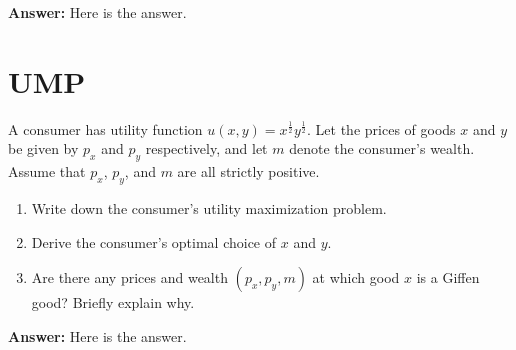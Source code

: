 \documentclass[12pt,a4paper]{article}
\begin{document}
\vspace{0.5cm}

\noindent\textbf{Answer:} Here is the answer.

\section{UMP}
A consumer has utility function $u(x,y)=x^{\frac{1}{2}}y^{\frac{1}{2}}$. Let the prices of goods $x$ and $y$ be given by $p_x$ and $p_y$ respectively, and let $m$ denote the consumer's wealth. Assume that $p_x$, $p_y$, and $m$ are all strictly positive.

\begin{enumerate}
  \item Write down the consumer's utility maximization problem.
  \item Derive the consumer's optimal choice of $x$ and $y$.
  \item Are there any prices and wealth $(p_x, p_y, m)$ at which good $x$ is a Giffen good? Briefly explain why.
\end{enumerate}

\vspace{0.5cm}

\noindent\textbf{Answer:} Here is the answer.

\end{document}
